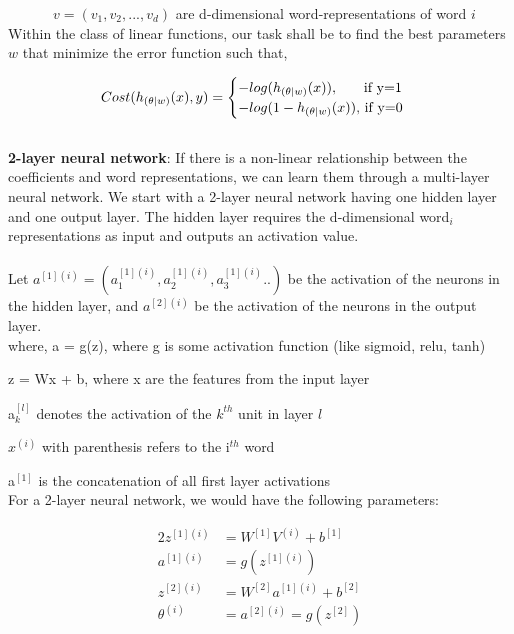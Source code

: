 $\quad\qquad\  v= (v_{1}, v_{2}, ..., v_{d})$ are d-dimensional word-representations of word $i$\\

Within the class of linear functions, our task shall be to find the best parameters $w$ that minimize the error function such that,

\begin{equation}\label{cost_fn_eq}
Cost(h_{(\theta| w)}(x), y) = 
\begin{cases}
-log(h_{(\theta| w)}(x)), $\qquad if y=1$
\\
-log(1-h_{(\theta| w)}(x)), $ if y=0$
\end{cases}
\end{equation}\\

\noindent\textbf{2-layer neural network}: If there is a non-linear relationship between the coefficients and word representations, we can learn them through a multi-layer neural network. We start with a 2-layer neural network having one hidden layer and one output layer. The hidden layer requires the d-dimensional word$_{i}$ representations as input and outputs an activation value.\\\\ Let $a^{[1](i)} = (a^{[1](i)}_{1},a^{[1](i)}_{2},a^{[1](i)}_{3}..)$ be the activation of the neurons in the hidden layer, and $a^{[2](i)}$ be the activation of the neurons in the output layer.\\

\noindent where, a = g(z), where g is some activation function (like sigmoid, relu, tanh)

\quad\quad z = Wx + b, where x are the features from the input layer

\quad\quad a$^{[l]}_{k}$ denotes the activation of the $k^{th}$ unit in layer $l$

\quad\quad $x^{(i)}$ with parenthesis refers to the i$^{th}$ word

\quad\quad a$^{[1]}$ is the concatenation of all first layer activations\\

\noindent For a 2-layer neural network, we would have the following parameters:

\begin{alignat}{2}
z^{[1](i)} & = W^{[1]}V^{(i)} + b^{[1]}\\
a^{[1](i)} & = g(z^{[1](i)})\\
z^{[2](i)} & = W^{[2]}a^{[1](i)} + b^{[2]}\\
\theta^{(i)} & = a^{[2](i)} = g(z^{[2]})
\end{alignat}

